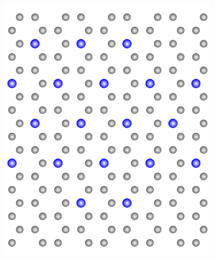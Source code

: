 \documentclass[a4paper, 10pt, twoside, openany]{book} %
\begin{document}
\begin{figure}
\begin{minipage}[b]{0.24\textwidth}
			\label{C2X-Insel}
		\end{minipage}
		\hfill
		\begin{minipage}[b]{0.24\textwidth}
			\includegraphics[width=\textwidth]{Abbildungen/C6X.pdf}
			\label{C6X-Insel}
		\end{minipage}
		\hfill
		\begin{minipage}[b]{0.24\textwidth}

\end{minipage}
\end{figure}
\end{document}
